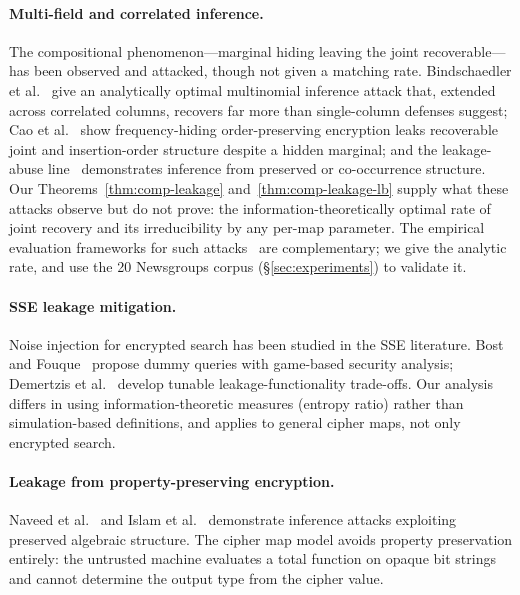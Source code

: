 \documentclass[11pt]{article}
\theoremstyle{definition}
\theoremstyle{plain}
\theoremstyle{remark}
\begin{document}
\paragraph{Multi-field and correlated inference.}
The compositional phenomenon---marginal hiding leaving the joint
recoverable---has been observed and attacked, though not given a matching
rate.  Bindschaedler et al.~\cite{bindschaedler2018tao} give an
analytically optimal multinomial inference attack that, extended across
correlated columns, recovers far more than single-column defenses suggest;
Cao et al.~\cite{cao2023frequency} show frequency-hiding order-preserving
encryption leaks recoverable joint and insertion-order structure despite a
hidden marginal; and the leakage-abuse line~\cite{cash2015leakage,
naveed2015inference,islam2012access} demonstrates inference from preserved
or co-occurrence structure.  Our Theorems~\ref{thm:comp-leakage}
and~\ref{thm:comp-leakage-lb} supply what these attacks observe but do not
prove: the information-theoretically optimal rate of joint recovery and its
irreducibility by any per-map parameter.  The empirical evaluation
frameworks for such attacks~\cite{kamara2022sok} are complementary; we give
the analytic rate, and use the 20 Newsgroups corpus
(\S\ref{sec:experiments}) to validate it.

\paragraph{SSE leakage mitigation.}
Noise injection for encrypted search has been studied in the SSE
literature.
Bost and Fouque~\cite{bost2017thwarting} propose dummy queries with
game-based security analysis; Demertzis et al.~\cite{demertzis2020seal}
develop tunable leakage-functionality trade-offs.
Our analysis differs in using information-theoretic measures (entropy
ratio) rather than simulation-based definitions, and applies to general
cipher maps, not only encrypted search.

\paragraph{Leakage from property-preserving encryption.}
Naveed et al.~\cite{naveed2015inference} and Islam et
al.~\cite{islam2012access} demonstrate inference attacks exploiting
preserved algebraic structure.
The cipher map model avoids property preservation entirely: the untrusted
machine evaluates a total function on opaque bit strings and cannot
determine the output type from the cipher value.
\end{document}
